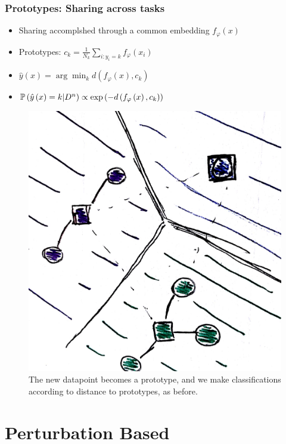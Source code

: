 \documentclass[10pt,mathserif]{beamer}
\begin{document}
\begin{frame}
  \frametitle{Prototypes: Sharing across tasks}
 \begin{itemize}
 \item Sharing accomplshed through a common embedding $f_{\varphi}\left(x\right)$
 \item Prototypes: $c_k = \frac{1}{N_k} \sum_{i : y_i = k} f_{\varphi}\left(x_i\right)$
 \item $\hat{y}\left(x\right) = \arg \min_{k} d\left(f_\varphi\left(x\right), c_k\right)$
 \item $\mathbb{P}\left({\hat{y}\left(x\right) = k \vert D^{n}}\right) \propto \operatorname{exp}\left(-d\left(f_\varphi\left(x\right), c_k\right)\right)$
 \end{itemize} 
\begin{figure}[ht]
  \centering
  \includegraphics[width=0.7\paperwidth]{figure/prototypes_5}
  \caption{The new datapoint becomes a prototype, and we make classifications
    according to distance to prototypes, as before.\label{fig:prototypes_5} }
\end{figure}
\end{frame}

\section{Perturbation Based}
\end{document}
